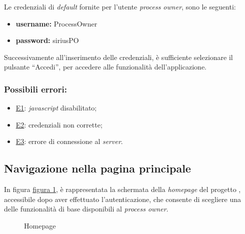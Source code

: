 Le credenziali di \textit{default} fornite per l'utente \textit{process owner}, sono le seguenti:
\begin{itemize}
\item \textbf{username:} ProcessOwner
\item \textbf{password:} siriusPO
\end{itemize}
Successivamente all'inserimento delle credenziali, è sufficiente selezionare il pulsante ``Accedi'', per accedere alle funzionalità dell'applicazione.

\subsubsection*{Possibili errori:}
\begin{itemize}
\item \hyperref[e1]{E1}: \textit{javascript} disabilitato;
\item \hyperref[e2]{E2}: credenziali non corrette;
\item \hyperref[e3]{E3}: errore di connessione al \textit{server}.
\end{itemize}


\subsection{Navigazione nella pagina principale}
\label{home}
In figura \hyperref[fig:Fhome]{figura \ref{fig:Fhome}}, è rappresentata la schermata della \textit{homepage} del progetto \progetto{}, accessibile dopo aver effettuato l'autenticazione, che consente di scegliere una delle funzionalità di base disponibili al \textit{process owner}.

\begin{figure}[H] \centering 
{} \caption{Homepage}
\label{fig:Fhome}
\end{figure}

